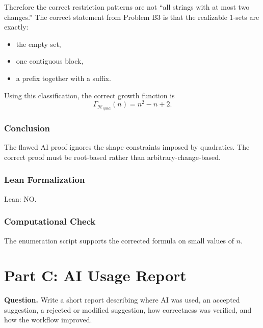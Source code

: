 \documentclass{article}
\newcommand{\growth}{\Gamma}
\newcommand{\classB}{\mathcal{H}_{\mathrm{quad}}}
\begin{document}
\begin{solutionbox}
Therefore the correct restriction patterns are not ``all strings with at most
two changes.'' The correct statement from Problem B3 is that the realizable
\(1\)-sets are exactly:
\begin{itemize}[leftmargin=2.5em]
    \item the empty set,
    \item one contiguous block,
    \item a prefix together with a suffix.
\end{itemize}
Using this classification, the correct growth function is
\[
\growth_{\classB}(n)=n^2-n+2.
\]

\subsubsection{Conclusion}

The flawed AI proof ignores the shape constraints imposed by quadratics. The
correct proof must be root-based rather than arbitrary-change-based.

\subsubsection{Lean Formalization}

Lean: NO.

\subsubsection{Computational Check}

The enumeration script supports the corrected formula on small values of \(n\).

\end{solutionbox}

\section{Part C: AI Usage Report}

\textbf{Question.}
\newline
Write a short report describing where AI was used, an accepted suggestion, a
rejected or modified suggestion, how correctness was verified, and how the
workflow improved.
\end{document}
